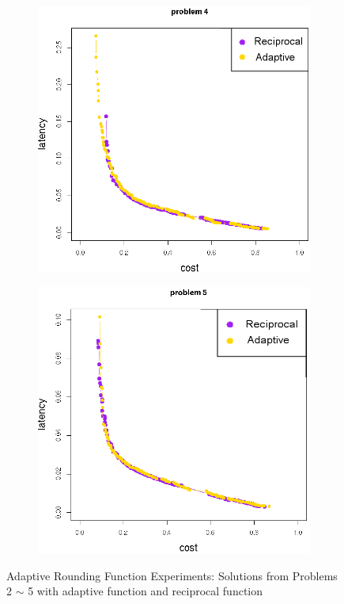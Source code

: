\begin{figure}[h!]
\begin{subfigure}{0.49\textwidth}
	   \caption{}
   \end{subfigure}
   \begin{subfigure}{0.49\textwidth}
       \includegraphics[width=\textwidth]{pics/transfer_problem4.png}
	   \caption{}
   \end{subfigure}
   \begin{subfigure}{0.49\textwidth}
       \includegraphics[width=\textwidth]{pics/transfer_problem5.png}
	   \caption{}
   \end{subfigure}
   \caption{Adaptive Rounding Function Experiments: Solutions from Problems 2 $\sim$ 5 with adaptive function and reciprocal function}
   \label{fig:transfer}
\end{figure}

